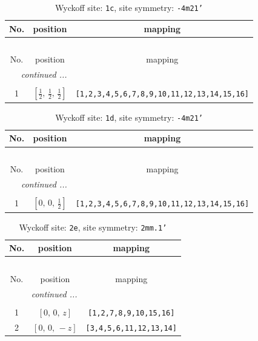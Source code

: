 \documentclass[fleqn,8pt]{jsarticle}
\begin{document}
\begin{longtable}{ccc}
\caption{Wyckoff site: {\tt 1c}, site symmetry: {\tt -4m21'}}
 \\
 \hline \hline
No. & position & mapping \\ \hline \endfirsthead

\multicolumn{2}{l}{\tablename\ \thetable{}} \\
 \hline \hline
No. & position & mapping \\ \hline \endhead

 \hline \hline
\multicolumn{2}{r}{\footnotesize\it continued ...} \\ \endfoot

 \hline \hline
\multicolumn{2}{r}{} \\ \endlastfoot

1 & $\left[ \frac{1}{2},\, \frac{1}{2},\, \frac{1}{2} \right]$ & {\tt [1,2,3,4,5,6,7,8,9,10,11,12,13,14,15,16]} \\
\end{longtable}
\renewcommand{\arraystretch}{1.2}
\begin{longtable}{ccc}
\caption{Wyckoff site: {\tt 1d}, site symmetry: {\tt -4m21'}}
 \\
 \hline \hline
No. & position & mapping \\ \hline \endfirsthead

\multicolumn{2}{l}{\tablename\ \thetable{}} \\
 \hline \hline
No. & position & mapping \\ \hline \endhead

 \hline \hline
\multicolumn{2}{r}{\footnotesize\it continued ...} \\ \endfoot

 \hline \hline
\multicolumn{2}{r}{} \\ \endlastfoot

1 & $\left[ 0,\, 0,\, \frac{1}{2} \right]$ & {\tt [1,2,3,4,5,6,7,8,9,10,11,12,13,14,15,16]} \\
\end{longtable}
\renewcommand{\arraystretch}{1.2}
\begin{longtable}{ccc}
\caption{Wyckoff site: {\tt 2e}, site symmetry: {\tt 2mm.1'}}
 \\
 \hline \hline
No. & position & mapping \\ \hline \endfirsthead

\multicolumn{2}{l}{\tablename\ \thetable{}} \\
 \hline \hline
No. & position & mapping \\ \hline \endhead

 \hline \hline
\multicolumn{2}{r}{\footnotesize\it continued ...} \\ \endfoot

 \hline \hline
\multicolumn{2}{r}{} \\ \endlastfoot

1 & $\left[ 0,\, 0,\, z \right]$ & {\tt [1,2,7,8,9,10,15,16]} \\ \hline
2 & $\left[ 0,\, 0,\, - z \right]$ & {\tt [3,4,5,6,11,12,13,14]} \\
\end{longtable}
\end{document}
